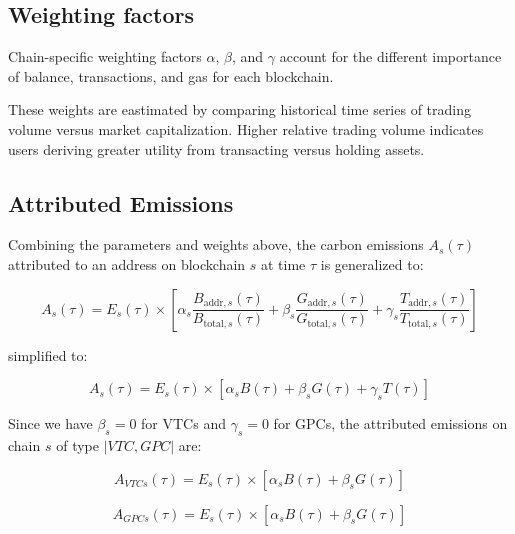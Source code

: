 \documentclass[11pt]{report}
\begin{document}
\subsection{Weighting factors}
Chain-specific weighting factors $\alpha$, $\beta$, and $\gamma$ account for the different importance of balance, transactions, and gas for each blockchain.

These weights are eastimated by comparing historical time series of trading volume versus market capitalization. Higher relative trading volume indicates users deriving greater utility from transacting versus holding assets.


\subsection{Attributed Emissions}

Combining the parameters and weights above, the carbon emissions \(A_s(\tau)\) attributed to an address on blockchain $s$ at time $\tau$ is generalized to:

\begin{equation}
    A_{s}(\tau) = E_{s}(\tau) \times 
        [
        \alpha_{s}\frac{B_{\text{addr},s}(\tau)}{B_{\text{total},s}(\tau)} + 
        \beta_{s}  \frac{G_{\text{addr},s}(\tau)}{G_{\text{total},s}(\tau)} + 
        \gamma_{s} \frac{T_{\text{addr},s}(\tau)}{T_{\text{total},s}(\tau)}
        ]
\end{equation}

simplified to:



\begin{equation}
    A_{s}(\tau) = E_{s}(\tau) \times [\alpha_{s} B(\tau) + \beta_{s} G(\tau) + \gamma_{s} T(\tau)]
\end{equation}

Since we have $\beta_{s} = 0$ for VTCs and $\gamma_{s} = 0$ for GPCs, the attributed emissions on chain $s$ of type $|VTC, GPC|$ are:

\begin{equation}
    A_{VTCs}(\tau) = E_{s}(\tau) \times [\alpha_{s} B(\tau) + \beta_{s} G(\tau)]
\end{equation}

\begin{equation}
    A_{GPCs}(\tau) = E_{s}(\tau) \times [\alpha_{s} B(\tau) + \beta_{s} G(\tau)]
\end{equation}
\end{document}
